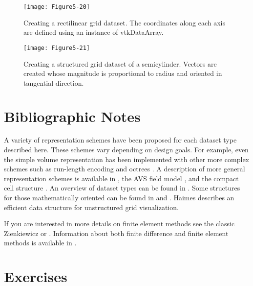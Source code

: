 \begin{figure}[!htb]
	\centering
	\texttt{[image: Figure5-20]}
	\caption{Creating a rectilinear grid dataset. The coordinates along each axis are defined using an instance of vtkDataArray.}
	\label{fig:Figure5-20}
\end{figure}

\begin{figure}[!htb]
	\centering
	\texttt{[image: Figure5-21]}
	\caption{Creating a structured grid dataset of a semicylinder. Vectors are created whose magnitude is proportional to radius and oriented in tangential direction.}
	\label{fig:Figure5-21}
\end{figure}



\section{Bibliographic Notes}

A variety of representation schemes have been proposed for each dataset type described here. These schemes vary depending on design goals. For example, even the simple volume representation has been implemented with other more complex schemes such as run-length encoding and octrees \cite{Bloomenthal88}. A description of more general representation schemes is available in \cite{Haber91}, the AVS field model \cite{AVS89}, and the compact cell structure \cite{Schroeder94}. An overview of dataset types can be found in \cite{Gelberg90}. Some structures for those mathematically oriented can be found in \cite{Brisson90} and \cite{Poluzzi93}. Haimes \cite{VISUAL3} describes an efficient data structure for unstructured grid visualization.

If you are interested in more details on finite element methods see the classic Zienkiewicz \cite{Zienkiewicz87} or \cite{Gallagher75}. Information about both finite difference and finite element methods is available in \cite{Lapidus82}.

\printbibliography


\section{Exercises}

